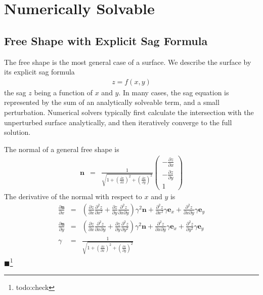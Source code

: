 \documentclass[12pt,a4paper,twoside,openright,BCOR10mm,headsepline,titlepage,abstracton,chapterprefix,final]{scrreprt}
\newcommand\Vector[1]{{\mathbf{#1}}}
\newcommand{\remark}[1]{{\color{red}$\blacksquare$}\footnote{{\color{red}#1}}}
\begin{document}
\section{Numerically Solvable}
\subsection{Free Shape with Explicit Sag Formula}
The free shape is the most general case of a surface.
We describe the surface by its explicit sag formula
\begin{eqnarray}
 z = f(x,y)
\end{eqnarray}
the sag $z$ being a function of $x$ and $y$.
In many cases, the sag equation is represented by the sum of an analytically solveable term, and a small perturbation.
Numerical solvers typically first calculate the intersection with the unperturbed surface analytically,
and then iteratively converge to the full solution.

The normal of a general free shape is
\begin{eqnarray}
 \Vector{n} &=& \frac{1}{\sqrt{ 1 + \left( \frac{\partial z}{\partial x} \right)^2 + \left( \frac{\partial z}{\partial y} \right)^2}}
 \begin{pmatrix}
  - \frac{\partial z}{\partial x}
  \\
  - \frac{\partial z}{\partial y}
  \\
  1
  \end{pmatrix} \label{eq:freeshape_normal}
\end{eqnarray}
The derivative of the normal with respect to $x$ and $y$ is
\begin{eqnarray}
 \frac{\partial \Vector{n}}{\partial x} &=&
  \left(
     \frac{\partial z}{\partial x} \frac{\partial^2 z}{\partial x^2}
   + \frac{\partial z}{\partial y} \frac{\partial^2 z}{\partial x \partial y}
  \right)
  \gamma^2 \Vector{n}
  +
  \frac{\partial^2 z}{\partial x^2} \gamma \Vector{e}_x
  +
  \frac{\partial^2 z}{\partial x \partial y} \gamma \Vector{e}_y
\\
 \frac{\partial \Vector{n}}{\partial y} &=&
  \left(
     \frac{\partial z}{\partial x} \frac{\partial^2 z}{\partial x \partial y}
   + \frac{\partial z}{\partial y} \frac{\partial^2 z}{\partial y^2}
  \right)
  \gamma^2 \Vector{n}
  +
  \frac{\partial^2 z}{\partial x \partial y} \gamma \Vector{e}_x
  +
  \frac{\partial^2 z}{\partial y^2} \gamma \Vector{e}_y
\\
  \gamma &=& \frac{1}{\sqrt{ 1 + \left( \frac{\partial z}{\partial x} \right)^2 + \left( \frac{\partial z}{\partial y} \right)^2}}
\end{eqnarray}
\remark{todo:check}
\end{document}
